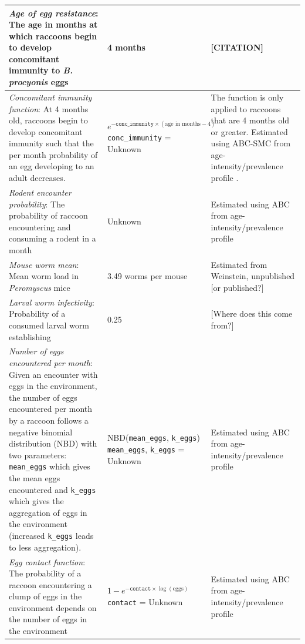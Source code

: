 \documentclass[11pt]{article}
\begin{document}
\begin{longtable}{p{4.5cm} p{4.5cm} p{5cm}}
\hline
\emph{Age of egg resistance}: The age in months at which raccoons begin to develop concomitant immunity to \emph{B. procyonis} eggs & 4 months & [CITATION]  \\
\hline
\emph{Concomitant immunity function}: At 4 months old, raccoons begin to develop concomitant immunity such that the per month probability of an egg developing to an adult decreases. & $e^{-\texttt{conc\_immunity} \times (\text{age in months} - 4)}$ \newline\newline \texttt{conc\_immunity} = Unknown  &  The function is only applied to raccoons that are 4 months old or greater. Estimated using ABC-SMC from age-intensity/prevalence profile \citep{Weinstein2016}. \\
\hline
\emph{Rodent encounter probability}: The probability of raccoon encountering and consuming a rodent in a month & Unknown & Estimated using ABC from age-intensity/prevalence profile \citep{Weinstein2016}\\
\hline
\emph{Mouse worm mean}: Mean worm load in \emph{Peromyscus} mice & 3.49 worms per mouse & Estimated from Weinstein, unpublished [or published?] \\
\hline
\emph{Larval worm infectivity}: Probability of a consumed larval worm establishing & 0.25 & [Where does this come from?] \\
\hline
\emph{Number of eggs encountered per month}: Given an encounter with eggs in the environment, the number of eggs encountered per month by a raccoon follows a negative binomial distribution (NBD) with two parameters: \texttt{mean\_eggs} which gives the mean eggs encountered and \texttt{k\_eggs} which gives the aggregation of eggs in the environment (increased \texttt{k\_eggs} leads to less aggregation). & NBD(\texttt{mean\_eggs}, \texttt{k\_eggs}) \newline\newline \texttt{mean\_eggs}, \texttt{k\_eggs} = Unknown & Estimated using ABC from age-intensity/prevalence profile \citep{Weinstein2016} \\
\hline
\emph{Egg contact function}: The probability of a raccoon encountering a clump of eggs in the environment depends on the number of eggs in the environment & $1 - e^{-\texttt{contact} \times \log(\text{eggs})}$ \newline\newline \texttt{contact} = Unknown & Estimated using ABC from age-intensity/prevalence profile \citep{Weinstein2016} \\ 

\end{longtable}
\end{document}
